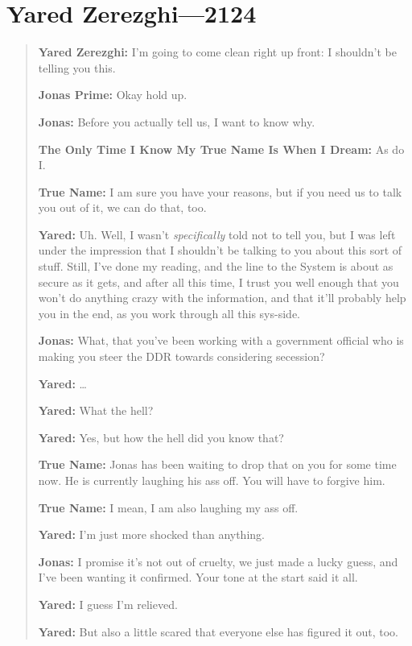 \hypertarget{yared-zerezghi-2124}{%
\chapter{Yared Zerezghi---2124}\label{yared-zerezghi-2124}}

\begin{quote}
\textbf{Yared Zerezghi:} I'm going to come clean right up front: I shouldn't be telling you this.

\textbf{Jonas Prime:} Okay hold up.

\textbf{Jonas:} Before you actually tell us, I want to know why.

\textbf{The Only Time I Know My True Name Is When I Dream:} As do I.

\textbf{True Name:} I am sure you have your reasons, but if you need us to talk you out of it, we can do that, too.

\textbf{Yared:} Uh. Well, I wasn't \emph{specifically} told not to tell you, but I was left under the impression that I shouldn't be talking to you about this sort of stuff. Still, I've done my reading, and the line to the System is about as secure as it gets, and after all this time, I trust you well enough that you won't do anything crazy with the information, and that it'll probably help you in the end, as you work through all this sys-side.

\textbf{Jonas:} What, that you've been working with a government official who is making you steer the DDR towards considering secession?

\textbf{Yared:} \ldots{}

\textbf{Yared:} What the hell?

\textbf{Yared:} Yes, but how the hell did you know that?

\textbf{True Name:} Jonas has been waiting to drop that on you for some time now. He is currently laughing his ass off. You will have to forgive him.

\textbf{True Name:} I mean, I am also laughing my ass off.

\textbf{Yared:} I'm just more shocked than anything.

\textbf{Jonas:} I promise it's not out of cruelty, we just made a lucky guess, and I've been wanting it confirmed. Your tone at the start said it all.

\textbf{Yared:} I guess I'm relieved.

\textbf{Yared:} But also a little scared that everyone else has figured it out, too.


\end{quote}
